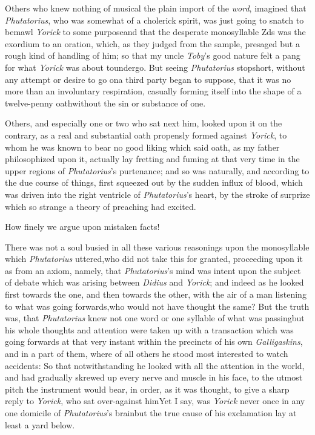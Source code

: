 \documentclass[twoside]{article}
\begin{document}
Others who knew nothing of musical\break 
{}
the plain import of the \textit{word}, imagined that
\textit{Phutatorius}, who was somewhat of a cholerick spirit, was
just going to snatch  to bemawl \textit{Yorick} to some purpose\tsk and
that the desperate monosyllable Z\tsh ds was the exordium
to an oration, which, as they judged from the sample, presaged but
a rough kind of handling of him;\break 
so that my uncle \textit{Toby}’s good nature felt\break
a pang for what \textit{Yorick} was about to\break undergo. But seeing
\textit{Phutatorius} stop\break short,
without any attempt or desire to go on\tsk a third party began to
suppose,
that it was no more than an involuntary respiration,
casually forming itself into the shape of a twelve-penny
oath\tsk without the sin or substance of one.

Others, and especially one or two who
sat next him, looked upon it on the contrary, 
as a real and substantial oath pro\-pensly 
formed against \textit{Yorick}, to whom
he was known to bear no good liking\tsk\break 
which said oath, as my father philosophized
upon it, actually lay fretting and 
fuming at that very time in the upper 
regions of \textit{Phutatorius}’s purtenance; and
so was naturally, and according to the
due course of things, first squeezed out
by the sudden influx of blood, which
was driven into the right ventricle of 
\textit{Phutatorius}’s heart, by the stroke of surprize 
which so strange a theory of 
preaching had excited.

How finely we argue upon mistaken facts!

There was not a soul busied in all these various reasonings upon
the monosyllable which \textit{Phutatorius} uttered,\tsk who did not
take this for granted, proceeding upon it as from an axiom, namely,
that \textit{Phutatorius}’s mind was intent upon the subject of debate which was arising between
\textit{Didius} and \textit{Yorick}; and indeed as he looked first
towards the one, and then towards the other, with the air of a man
listening to what was going forwards,\tsk who would not have
thought the same? But the truth was, that \textit{Phutatorius} knew
not one word or one syllable of what was passing\tsk but his
whole thoughts and attention were taken up with a transaction which
was going forwards at that very instant within the precincts of his
own \textit{Galligaskins}, and in a part of them, where of all others
he stood most interested to watch accidents: So that
notwithstanding he looked with all the attention in the world, and
had gradually skrewed up every nerve and muscle in his face, to the
utmost pitch the instrument would bear, in order, as it was
thought, to give a sharp reply to \textit{Yorick}, who sat
over-against him\tsk Yet I say, was \textit{Yorick} never
once in any one domicile of \textit{Phutatorius}’s
brain\tsk but the true cause of his exclamation lay at
least a yard below.
\end{document}

